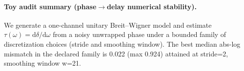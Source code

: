 \paragraph{Toy audit summary (phase$\to$delay numerical stability).}
\AuditTag We generate a one-channel unitary Breit--Wigner model and estimate $\tau(\omega)=\mathrm{d}\delta/\mathrm{d}\omega$ from a noisy unwrapped phase under a bounded family of discretization choices (stride and smoothing window). The best median abs-log mismatch in the declared family is 0.022 (max 0.924) attained at stride=2, smoothing window w=21.
